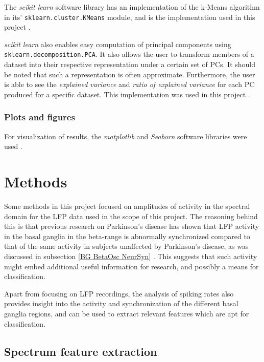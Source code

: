 \documentclass{article}
\begin{document}
The \textit{scikit learn} software library has an implementation of the k-Means algorithm in its' \texttt{sklearn.cluster.KMeans} module, and is the implementation used in this project \citep{SKLEARN}.

\textit{scikit learn} also enables easy computation of principal components using \texttt{sklearn.decomposition.PCA}.
It also allows the user to transform members of a dataset into their respective representation under a certain set of PCs. 
It should be noted that such a representation is often approximate.
Furthermore, the user is able to see the \textit{explained variance} and \textit{ratio of explained variance} for each PC produced for a specific dataset. 
This implementation was used in this project \citep{SKLEARN}.

\subsubsection{Plots and figures}

For visualization of results, the \textit{matplotlib} and \textit{Seaborn} software libraries were used \citep{MPL} \citep{Seaborn}.

\newpage
\section{Methods}

Some methods in this project focused on amplitudes of activity in the spectral domain for the LFP data used in the scope of this project.
The reasoning behind this is that previous research on Parkinson's disease has shown that LFP activity in the basal ganglia in the beta-range is abnormally synchronized compared to that of the same activity in subjects unaffected by Parkinson's disease, as was discussed in subsection \ref{BG BetaOsc NeurSyn} \citep{Cagnan}.
This suggests that such activity might embed additional useful information for research, and possibly a means for classification. 

Apart from focusing on LFP recordings, the analysis of spiking rates also provides insight into the activity and synchronization of the different basal ganglia regions, and can be used to extract relevant features which are apt for classification.

\subsection{Spectrum feature extraction}\label{DFT Method}
\end{document}
